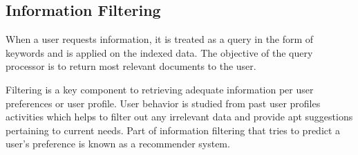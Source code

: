 \subsection{Information Filtering}

When a user requests information, it is treated as a query in the form of keywords and is applied on the indexed data. The objective of the query processor is to return most relevant documents to the user.

Filtering is a key component to retrieving adequate information per user preferences or user profile. User behavior is studied from past user profiles activities which helps to filter out any irrelevant data and provide apt suggestions pertaining to current needs. Part of information filtering that tries to predict a user's preference is known as a recommender system.